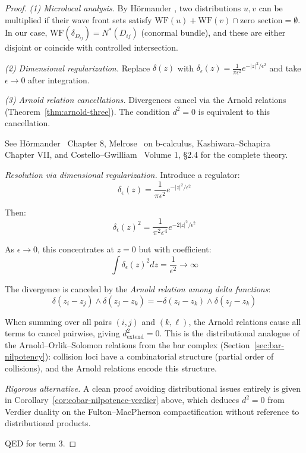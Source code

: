 \begin{proof}
{\emph{(1) Microlocal analysis.} By Hörmander \cite[Theorem 8.2.10]{Hormander}, two distributions 
$u, v$ can be multiplied if their wave front sets satisfy 
$\text{WF}(u) + \text{WF}(v) \cap \text{zero section} = \emptyset$. In our case, 
$\text{WF}(\delta_{D_{ij}}) = N^*(D_{ij})$ (conormal bundle), and these are either disjoint 
or coincide with controlled intersection.

\emph{(2) Dimensional regularization.} Replace $\delta(z)$ with 
$\delta_\epsilon(z) = \frac{1}{\pi\epsilon^2} e^{-|z|^2/\epsilon^2}$ and take $\epsilon \to 0$ 
after integration.

\emph{(3) Arnold relation cancellations.} Divergences cancel via the Arnold relations 
(Theorem~\ref{thm:arnold-three}). The condition $d^2 = 0$ is equivalent to this cancellation.

See Hörmander~\cite{Hormander} Chapter 8, Melrose~\cite{Mel93} on b-calculus, Kashiwara--Schapira~\cite{KS94} Chapter VII, and Costello--Gwilliam~\cite{CG17} Volume 1, \S2.4 for the complete theory.%
}%

\emph{Resolution via dimensional regularization.} Introduce a regulator:
\[\delta_\epsilon(z) = \frac{1}{\pi \epsilon^2} e^{-|z|^2/\epsilon^2}\]

Then:
\[\delta_\epsilon(z)^2 = \frac{1}{\pi^2 \epsilon^4} e^{-2|z|^2/\epsilon^2}\]

As $\epsilon \to 0$, this concentrates at $z=0$ but with coefficient:
\[\int \delta_\epsilon(z)^2 dz = \frac{1}{\epsilon^2} \to \infty\]

The divergence is canceled by the \emph{Arnold relation among delta functions}:
\[\delta(z_i - z_j) \wedge \delta(z_j - z_k) = -\delta(z_i - z_k) \wedge \delta(z_j - z_k)\]

When summing over all pairs $(i,j)$ and $(k,\ell)$, the Arnold
relations cause all terms to cancel pairwise, giving $d_{\text{extend}}^2 = 0$.
This is the distributional analogue of the
Arnold--Orlik--Solomon relations from the bar complex (Section~\ref{sec:bar-nilpotency}):
collision loci have a combinatorial structure (partial order of collisions), and
the Arnold relations encode this structure.

\emph{Rigorous alternative.}  A clean proof avoiding distributional issues entirely is given in Corollary~\ref{cor:cobar-nilpotence-verdier} above, which deduces $d^2 = 0$ from Verdier duality on the Fulton--MacPherson compactification without reference to distributional products.

QED for term 3.


\end{proof}
